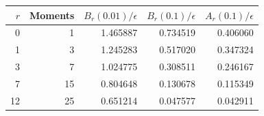 \begin{tabular}{rrrrr}
\toprule
$r$ & Moments & $B_r(0.01)/\epsilon$ & $B_r(0.1)/\epsilon$ & $A_r(0.1)/\epsilon$\\
\midrule
0 & 1 & 1.465887 & 0.734519 & 0.406060\\
1 & 3 & 1.245283 & 0.517020 & 0.347324\\
3 & 7 & 1.024775 & 0.308511 & 0.246167\\
7 & 15 & 0.804648 & 0.130678 & 0.115349\\
12 & 25 & 0.651214 & 0.047577 & 0.042911\\
\bottomrule
\end{tabular}
